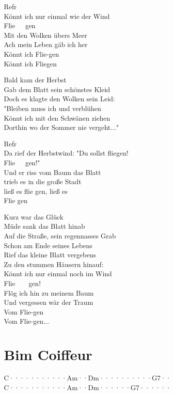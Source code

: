 \documentclass[
  letterpaper,
  twoside=false]{scrbook}
\begin{document}
Refr\\
Könnt ich nur einmal wie der Wind\\
Flie~~~gen\\
Mit den Wolken übers Meer\\
Ach mein Leben gäb ich her\\
Könnt ich Flie-gen\\
Könnt ich Fliegen

Bald kam der Herbst\\
Gab dem Blatt sein schönstes Kleid\\
Doch es klagte den Wolken sein Leid:\\
"Bleiben muss ich und verblühen\\
Könnt ich mit den Schwänen ziehen\\
Dorthin wo der Sommer nie vergeht..."

Refr\\
Da rief der Herbstwind: "Du sollst fliegen!\\
Flie~~~gen!"\\
Und er riss vom Baum das Blatt\\
trieb es in die große Stadt\\
ließ es flie gen, ließ es\\
Flie gen

Kurz war das Glück\\
Müde sank das Blatt hinab\\
Auf die Straße, sein regennasses Grab\\
Schon am Ende seines Lebens\\
Rief das kleine Blatt vergebens\\
Zu den stummen Häusern hinauf:\\
Könnt ich nur einmal noch im Wind\\
Flie~~~~gen!\\
Flög ich hin zu meinem Baum\\
Und vergessen wär der Traum\\
Vom Flie-gen\\
Vom Flie-gen...

\hypertarget{bim-coiffeur}{%
\chapter{Bim Coiffeur}\label{bim-coiffeur}}

\textbar C·······\textbar····Am··\textbar Dm······\textbar····G7··\textbar{}\\
\textbar C·······\textbar····Am··\textbar Dm······\textbar G7······\textbar{}
\end{document}

